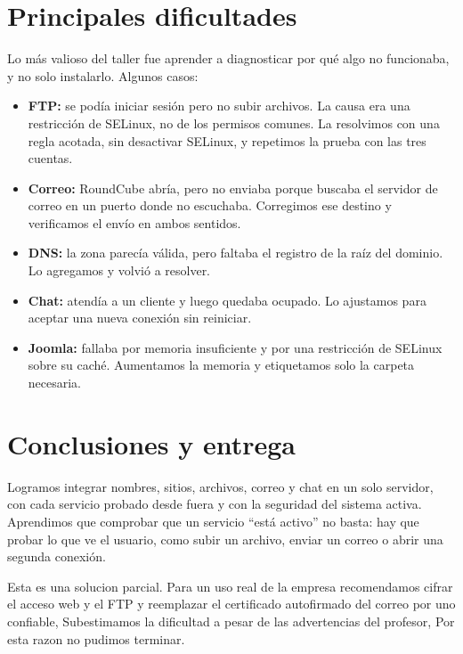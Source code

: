 \documentclass[11pt,a4paper]{article}
\begin{document}
\section{Principales dificultades}
Lo más valioso del taller fue aprender a diagnosticar por qué algo no funcionaba, y no solo instalarlo. Algunos casos:
\begin{itemize}\setlength\itemsep{0pt}
\item \textbf{FTP:} se podía iniciar sesión pero no subir archivos. La causa era una restricción de SELinux, no de los permisos comunes. La resolvimos con una regla acotada, sin desactivar SELinux, y repetimos la prueba con las tres cuentas.
\item \textbf{Correo:} RoundCube abría, pero no enviaba porque buscaba el servidor de correo en un puerto donde no escuchaba. Corregimos ese destino y verificamos el envío en ambos sentidos.
\item \textbf{DNS:} la zona parecía válida, pero faltaba el registro de la raíz del dominio. Lo agregamos y volvió a resolver.
\item \textbf{Chat:} atendía a un cliente y luego quedaba ocupado. Lo ajustamos para aceptar una nueva conexión sin reiniciar.
\item \textbf{Joomla:} fallaba por memoria insuficiente y por una restricción de SELinux sobre su caché. Aumentamos la memoria y etiquetamos solo la carpeta necesaria.
\end{itemize}

\section{Conclusiones y entrega}
Logramos integrar nombres, sitios, archivos, correo y chat en un solo servidor, con cada servicio probado desde fuera y con la seguridad del sistema activa. Aprendimos que comprobar que un servicio ``está activo'' no basta: hay que probar lo que ve el usuario, como subir un archivo, enviar un correo o abrir una segunda conexión.

Esta es una solucion parcial. Para un uso real de la empresa recomendamos cifrar el acceso web y el FTP y reemplazar el certificado autofirmado del correo por uno confiable, Subestimamos la dificultad a pesar de las advertencias del profesor, Por esta razon no pudimos terminar.
\end{document}

